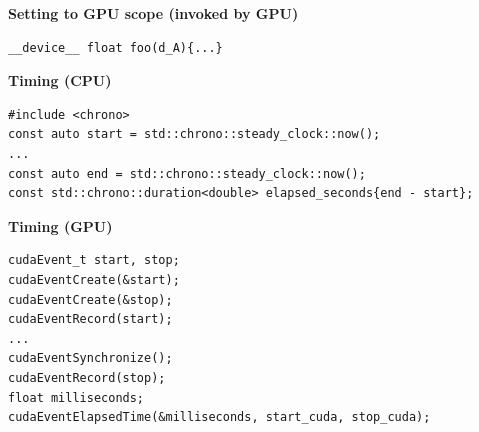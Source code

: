 \documentclass[11pt,a4paper]{article}
\begin{document}
\textbf{Setting to GPU scope (invoked by GPU)}
\begin{lstlisting}[language=CUDA,numbers=none]
__device__ float foo(d_A){...}
\end{lstlisting}

\textbf{Timing (CPU)}
\begin{lstlisting}[language=CUDA,numbers=none]
#include <chrono>
const auto start = std::chrono::steady_clock::now();
...
const auto end = std::chrono::steady_clock::now();
const std::chrono::duration<double> elapsed_seconds{end - start};
\end{lstlisting}

\textbf{Timing (GPU)}
\begin{lstlisting}[language=CUDA,numbers=none]
cudaEvent_t start, stop;
cudaEventCreate(&start);
cudaEventCreate(&stop);
cudaEventRecord(start);
...
cudaEventSynchronize();
cudaEventRecord(stop);
float milliseconds;
cudaEventElapsedTime(&milliseconds, start_cuda, stop_cuda);
\end{lstlisting}
\end{document}
